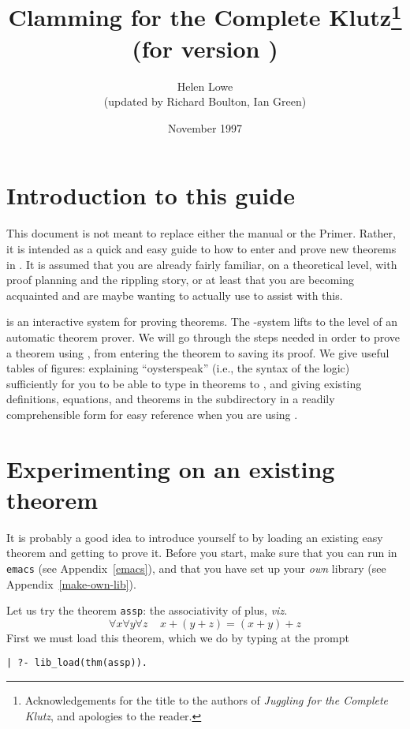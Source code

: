 \documentclass{article}
\title{Clamming for the Complete Klutz\thanks
{Acknowledgements for the title to the authors of
{\em Juggling for the Complete Klutz}, and apologies to the reader.}\\
{\large (for \clam version \clamversion)}}
\author{Helen Lowe\\(updated by Richard Boulton, Ian Green)}
\date{November 1997}
\begin{document}
\maketitle


\section{Introduction to this guide}

This document is not meant to replace either the \clam manual
or the \clam Primer. Rather, it is intended as a quick and easy guide to
how to enter and prove new theorems in \clam. It is assumed that you
are already fairly familiar, on a theoretical level, with proof planning
and the rippling story, or at least that you are becoming acquainted
and are maybe wanting to actually use \clam to assist with this.

\oyster is an interactive system for proving theorems. The
\clam-\oyster system lifts \oyster to the level of an automatic
theorem prover.  We will go through the steps needed in order to prove
a theorem using \clam, from entering the theorem to saving its
proof. We give useful tables of figures: explaining ``oysterspeak''
(i.e., the syntax of the \oyster logic) sufficiently for you to be
able to type in theorems to \clam, and giving existing definitions,
equations, and theorems in the \clam subdirectory in a readily
comprehensible form for easy reference when you are using \clam.



\section{Experimenting on an existing theorem\label{try-old-thm}}

It is probably a good idea to introduce yourself to \clam by loading
an existing easy theorem and getting \clam to prove it. 
Before you start, make sure that
you can run \clam in {\tt emacs} (see Appendix~\ref{emacs}), and
that you have set up your {\em own} \clam library (see
Appendix~\ref{make-own-lib}).

Let us try the theorem {\tt assp}: the associativity of plus, {\em viz.}
\[ \forall x \forall y \forall z \; \; \; \; x + (y + z) = (x + y) + z \]
First we must load this theorem, which we do by typing at the \clam
prompt 

\begin{verbatim}
| ?- lib_load(thm(assp)).
\end{verbatim}
\end{document}
